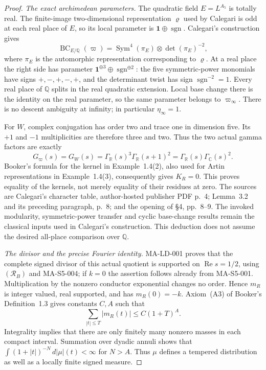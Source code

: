 \begin{proof}
\emph{The exact archimedean parameters.}
The quadratic field $E=L^{A_5}$ is totally real. The finite-image
two-dimensional representation $\varrho$ used by Calegari is odd
at each real place of $E$, so its local parameter is
$\mathbf1\oplus\operatorname{sgn}$. Calegari's construction gives
\[
 \operatorname{BC}_{E/\mathbb Q}(\varpi)
  =\operatorname{Sym}^4(\pi_E)\otimes\det(\pi_E)^{-2},
 \tag{MA-FQ.1c}
\]
where $\pi_E$ is the automorphic representation corresponding to
$\varrho$. At a real place the right side has parameter
$\mathbf1^{\oplus3}\oplus\operatorname{sgn}^{\oplus2}$:
the five symmetric-power monomials have signs $+,-,+,-,+$,
and the determinant twist has sign $\operatorname{sgn}^{-2}=1$.
Every real place of $\mathbb Q$ splits in the real quadratic
extension. Local base change there is the identity on the real
parameter, so the same parameter belongs to $\varpi_\infty$.
There is no descent ambiguity at infinity; in particular
$\eta_\infty=1$.

For $W$, complex conjugation has order two and trace one in
dimension five. Its $+1$ and $-1$ multiplicities are therefore
three and two. Thus the two actual gamma factors are exactly
\[
 G_{\varpi}(s)=G_W(s)
  =\Gamma_{\mathbb R}(s)^3\Gamma_{\mathbb R}(s+1)^2
  =\Gamma_{\mathbb R}(s)\Gamma_{\mathbb C}(s)^2.
 \tag{MA-FQ.1d}
\]
Booker's formula for the kernel in Example~1.4(2), also used for
Artin representations in Example~1.4(3), consequently gives
$K_R=0$. This proves equality of the kernels, not merely equality
of their residues at zero. The sources are Calegari's character
table, author-hosted publisher PDF p.~4; Lemma~3.2 and its
preceding paragraph, p.~8; and the opening of \S4, pp.~8--9.
The invoked modularity, symmetric-power transfer and cyclic
base-change results remain the classical inputs used in
Calegari's construction. This deduction does not assume the
desired all-place comparison over $\mathbb Q$.

\emph{The divisor and the precise Fourier identity.}
MA-LD-001 proves that the complete signed divisor of this actual
quotient is supported on $\operatorname{Re}s=1/2$, using
$(\mathcal R_B)$ and MA-S5-004; if $k=0$ the assertion follows
already from MA-S5-001. Multiplication by the nonzero conductor
exponential changes no order. Hence $m_R$ is integer valued,
real supported, and has $m_R(0)=-k$. Axiom~(A3) of Booker's
Definition~1.3 gives constants $C,A$ such that
\[
 \sum_{|t|\le T}|m_R(t)|\le C(1+T)^A.
 \tag{MA-FQ.1e}
\]
Integrality implies that there are only finitely many nonzero
masses in each compact interval. Summation over dyadic annuli
shows that $\int(1+|t|)^{-N}\,d|\mu|(t)<\infty$ for $N>A$.
Thus $\mu$ defines a tempered distribution as well as a locally
finite signed measure.


\end{proof}
